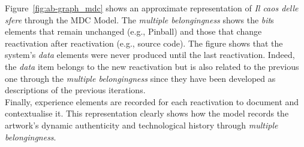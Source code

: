 Figure~\ref{fig:ab-graph_mdc} shows an approximate representation of \textit{Il caos delle sfere} through the MDC Model. The \textit{multiple belongingness} shows the \textit{bit}s elements that remain unchanged (e.g., Pinball) and those that change reactivation after reactivation (e.g., source code). The figure shows that the system's \textit{data} elements were never produced until the last reactivation. Indeed, the \textit{data} item belongs to the new reactivation but is also related to the previous one through the \textit{multiple belongingness} since they have been developed as descriptions of the previous iterations.\\
Finally, experience elements are recorded for each reactivation to document and contextualise it. This representation clearly shows how the model records the artwork's dynamic authenticity and technological history through \textit{multiple belongingness}. 

